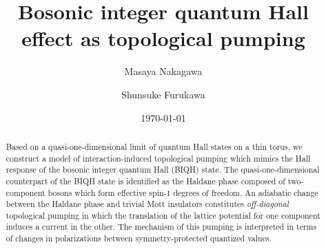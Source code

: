 \documentclass[aps,prb,twocolumn,superscriptaddress,showpacs,floatfix]{revtex4-1}
\begin{document}


\title{Bosonic integer quantum Hall effect as topological pumping}
\author{Masaya Nakagawa}
\author{Shunsuke Furukawa}
\date{\today}




\begin{abstract}
Based on a quasi-one-dimensional limit of quantum Hall states on a thin torus, we construct a model of interaction-induced topological pumping which mimics the Hall response of the bosonic integer quantum Hall (BIQH) state. The quasi-one-dimensional counterpart of the BIQH state is identified as the Haldane phase composed of two-component bosons which form effective spin-$1$ degrees of freedom. 
An adiabatic change between the Haldane phase and trivial Mott insulators constitutes {\it off-diagonal} topological pumping in which the translation of the lattice potential for one component induces a current in the other. The mechanism of this pumping is interpreted in terms of changes in polarizations between symmetry-protected quantized values. 
\end{abstract}
\end{document}
